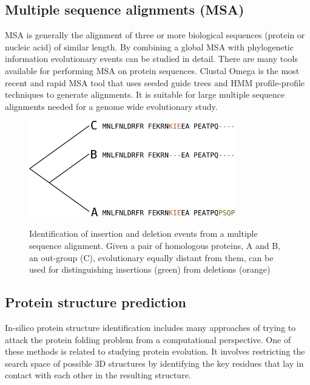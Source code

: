 \documentclass[11pt, a4paper,oneside]{report}
\begin{document}
\subsection{Multiple sequence alignments (MSA)}
 MSA is generally the alignment of three or more biological sequences (protein or nucleic acid) of similar length. By combining a global MSA with phylogenetic information evolutionary events can be studied in detail. There are many tools available for performing MSA on protein sequences. Clustal Omega is the most recent and rapid MSA tool \cite{Sievers2011} that uses seeded guide trees and HMM profile-profile techniques to generate alignments. It is suitable for large multiple sequence alignments needed for a genome wide evolutionary study. 

\begin{figure}[t]
\begin{center}
\label{img:populations}
\includegraphics[width=0.8\textwidth]{figures/indel.png}
\end{center}
\caption{Identification of insertion and deletion events from a multiple sequence alignment. Given a pair of homologous proteins, A and B, an out-group (C), evolutionary equally distant from them, can be used for distinguishing insertions (green) from deletions (orange)} 
\end{figure}

\subsection{Protein structure prediction}
In-silico protein structure identification includes many approaches of trying to attack the protein folding problem from a computational perspective. One of these methods is  related to studying protein evolution. It involves restricting the search space of possible 3D structures by identifying the key residues that lay in contact with each other in the resulting structure. 
\end{document}
